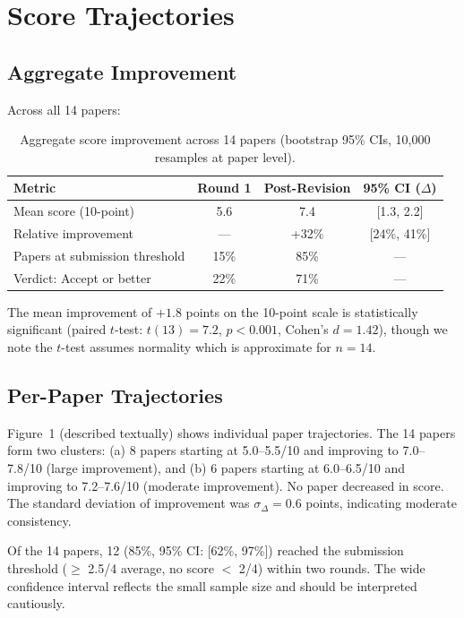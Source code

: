 \section{Score Trajectories}

\subsection{Aggregate Improvement}

Across all 14 papers:

\begin{table}[h]
\centering
\begin{tabular}{lccc}
\toprule
Metric & Round 1 & Post-Revision & 95\% CI ($\Delta$) \\
\midrule
Mean score (10-point) & 5.6 & 7.4 & [1.3, 2.2] \\
Relative improvement & --- & +32\% & [24\%, 41\%] \\
Papers at submission threshold & 15\% & 85\% & --- \\
Verdict: Accept or better & 22\% & 71\% & --- \\
\bottomrule
\end{tabular}
\caption{Aggregate score improvement across 14 papers (bootstrap 95\% CIs, 10{,}000 resamples at paper level).}
\end{table}

\noindent The mean improvement of $+1.8$ points on the 10-point scale is statistically significant (paired $t$-test: $t(13) = 7.2$, $p < 0.001$, Cohen's $d = 1.42$), though we note the $t$-test assumes normality which is approximate for $n=14$.

\subsection{Per-Paper Trajectories}

Figure~1 (described textually) shows individual paper trajectories. The 14 papers form two clusters: (a) 8 papers starting at 5.0--5.5/10 and improving to 7.0--7.8/10 (large improvement), and (b) 6 papers starting at 6.0--6.5/10 and improving to 7.2--7.6/10 (moderate improvement). No paper decreased in score. The standard deviation of improvement was $\sigma_{\Delta} = 0.6$ points, indicating moderate consistency.

Of the 14 papers, 12 (85\%, 95\% CI: [62\%, 97\%]) reached the submission threshold ($\geq$ 2.5/4 average, no score $<$ 2/4) within two rounds. The wide confidence interval reflects the small sample size and should be interpreted cautiously.


